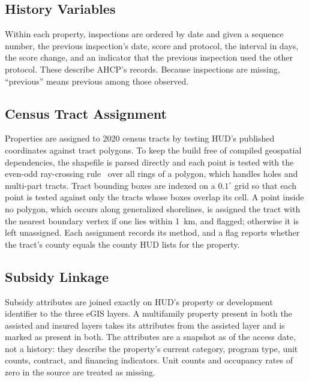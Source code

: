 \documentclass[10pt,twocolumn,letterpaper]{article}
\begin{document}
\subsection{History Variables}
Within each property, inspections are ordered by date and given a sequence number, the previous inspection's date, score and protocol, the interval in days, the score change, and an indicator that the previous inspection used the other protocol. These describe AHCP's records. Because inspections are missing, ``previous'' means previous among those observed.

\subsection{Census Tract Assignment}\label{sec:tract}
Properties are assigned to 2020 census tracts by testing HUD's published coordinates against tract polygons. To keep the build free of compiled geospatial dependencies, the shapefile is parsed directly and each point is tested with the even-odd ray-crossing rule~\cite{shimrat1962} over all rings of a polygon, which handles holes and multi-part tracts. Tract bounding boxes are indexed on a $0.1^\circ$ grid so that each point is tested against only the tracts whose boxes overlap its cell. A point inside no polygon, which occurs along generalized shorelines, is assigned the tract with the nearest boundary vertex if one lies within 1~km, and flagged; otherwise it is left unassigned. Each assignment records its method, and a flag reports whether the tract's county equals the county HUD lists for the property.

\subsection{Subsidy Linkage}
Subsidy attributes are joined exactly on HUD's property or development identifier to the three eGIS layers. A multifamily property present in both the assisted and insured layers takes its attributes from the assisted layer and is marked as present in both. The attributes are a snapshot as of the access date, not a history: they describe the property's current category, program type, unit counts, contract, and financing indicators. Unit counts and occupancy rates of zero in the source are treated as missing.
\end{document}
